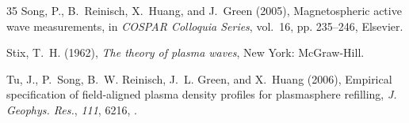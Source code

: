 \documentclass[a4paper]{article}
\renewenvironment{thebibliography}[1]{\begin{oldthebibliography}{#1}\setlength{\parskip}{0ex}\setlength{\itemsep}{0ex}}{\end{oldthebibliography}}
\begin{document}
\begin{thebibliography}{35}
Song, P., B.~Reinisch, X.~Huang, and J.~Green (2005), Magnetospheric active
  wave measurements, in \textit{COSPAR Colloquia Series}, vol.~16, pp.
  235--246, Elsevier.

Stix, T.~H. (1962), \textit{The theory of plasma waves}, New York: McGraw-Hill.

Tu, J., P.~Song, B.~W. Reinisch, J.~L. Green, and X.~Huang (2006), Empirical
  specification of field-aligned plasma density profiles for plasmasphere
  refilling, \textit{J. Geophys. Res.}, \textit{111}, 6216,
  .

\end{thebibliography}
\end{document}
